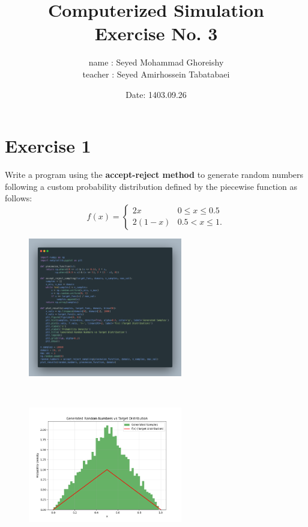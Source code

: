 \documentclass[a4paper,12pt]{article}
\title{Computerized Simulation \\
Exercise No. 3}
\author{name : Seyed Mohammad Ghoreishy \\ teacher : Seyed Amirhossein Tabatabaei }
\date{Date: 1403.09.26}
\begin{document}
\maketitle
\tableofcontents 
\newpage

\section{Exercise 1}
Write a program using the \textbf{accept-reject method} to generate random numbers following a custom probability distribution defined by the piecewise function as follows:
\begin{equation*}
    f(x) = \begin{cases} 
    2x & 0 \leq x \leq 0.5 \\
    2(1 - x) & 0.5 < x \leq 1.
    \end{cases}
\end{equation*}
\begin{figure}[h!]
    \centering
    \includegraphics[width=0.6\textwidth]{./Screenshots/1.py.png} 
\end{figure} \\
\begin{figure}[h!]
    \centering
    \includegraphics[width=0.6\textwidth]{./Screenshots/1.png} 
\end{figure} 
\newpage
\end{document}
